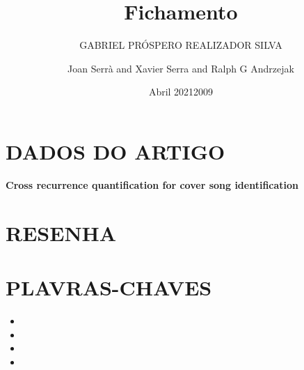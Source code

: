 \documentclass{article}
\title{Fichamento}
\author{GABRIEL PRÓSPERO REALIZADOR  SILVA}
\date{Abril 2021}
\begin{document}
\maketitle

\section{DADOS DO ARTIGO}
\textbf{Cross recurrence quantification for cover song identification \\}
\author{Joan Serr{\`{a}} and Xavier Serra and Ralph G Andrzejak\\}
\date{2009}

\section{RESENHA}


\section{PLAVRAS-CHAVES}
\begin{itemize}
    \item 
    \item 
    \item 
    \item 
\end{itemize}
\end{document}
